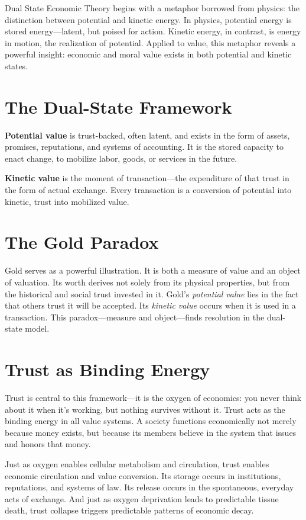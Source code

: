 \documentclass[11pt,oneside]{book}
\begin{document}
Dual State Economic Theory begins with a metaphor borrowed from physics: the distinction between potential and kinetic energy. In physics, potential energy is stored energy—latent, but poised for action. Kinetic energy, in contrast, is energy in motion, the realization of potential. Applied to value, this metaphor reveals a powerful insight: economic and moral value exists in both potential and kinetic states.

\section{The Dual-State Framework}

\textbf{Potential value} is trust-backed, often latent, and exists in the form of assets, promises, reputations, and systems of accounting. It is the stored capacity to enact change, to mobilize labor, goods, or services in the future. 

\textbf{Kinetic value} is the moment of transaction—the expenditure of that trust in the form of actual exchange. Every transaction is a conversion of potential into kinetic, trust into mobilized value.

\section{The Gold Paradox}

Gold serves as a powerful illustration. It is both a measure of value and an object of valuation. Its worth derives not solely from its physical properties, but from the historical and social trust invested in it. Gold's \textit{potential value} lies in the fact that others trust it will be accepted. Its \textit{kinetic value} occurs when it is used in a transaction. This paradox—measure and object—finds resolution in the dual-state model.

\section{Trust as Binding Energy}

Trust is central to this framework—it is the oxygen of economics: you never think about it when it's working, but nothing survives without it. Trust acts as the binding energy in all value systems. A society functions economically not merely because money exists, but because its members believe in the system that issues and honors that money.

Just as oxygen enables cellular metabolism and circulation, trust enables economic circulation and value conversion. Its storage occurs in institutions, reputations, and systems of law. Its release occurs in the spontaneous, everyday acts of exchange. And just as oxygen deprivation leads to predictable tissue death, trust collapse triggers predictable patterns of economic decay.
\end{document}
